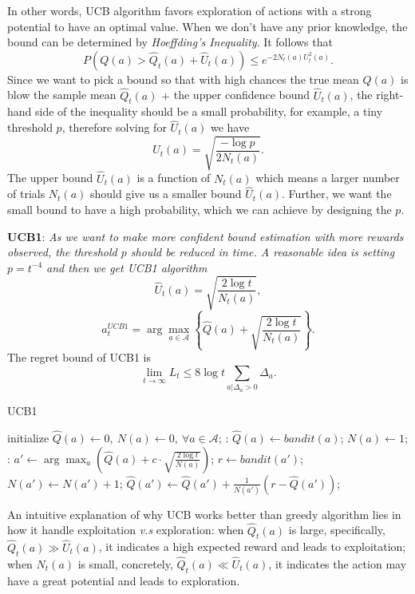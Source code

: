 \documentclass{progartcn}
\begin{document}
    	In other words, UCB algorithm favors exploration of actions with a strong potential to have an optimal value. When we don't have any prior knowledge, the bound can be determined by \textit{Hoeffding's Inequality}. It follows that
    	\[P(Q(a)> \hat{Q}_t(a)+\hat{U}_t(a))\le e^{-2N_t(a)U_t^2(a)}.\]
    	Since we want to pick a bound so that with high chances the true mean $Q(a)$ is blow the sample mean $\hat{Q}_t(a)$ $+$ the upper confidence bound $\hat{U}_t(a)$, the right-hand side of the inequality should be a small probability, for example, a tiny threshold $p$, therefore solving for $\hat{U}_t(a)$ we have
    	\[\hat{U}_t(a)=\sqrt{\frac{-\log p}{2N_t(a)}}.\]
    	The upper bound $\hat{U}_t(a)$ is a function of $N_t(a)$ which means a larger number of trials $N_t(a)$ should give us a smaller bound $\hat{U}_t(a)$. Further, we want the small bound to have a high probability, which we can achieve by designing the $p$.

    	\textbf{UCB1}: \textit{As we want to make more confident bound estimation with more rewards observed, the threshold $p$ should be reduced in time. A reasonable idea is setting $p=t^{-4}$ and then we get UCB1 algorithm}
    	\[\hat{U}_t(a)=\sqrt{\frac{2\log t}{N_t(a)}},\]
    	\[a_t^{UCB1}=\arg\max_{a\in \mathcal{A}}\left\{\hat{Q}(a)+\sqrt{\frac{2\log t}{N_t(a)}}\right\}.\]
    	The regret bound of UCB1 is
    	\[\lim_{t\to\infty}L_t\le 8\log t\sum_{a|\Delta_a>0} \Delta_a.\]

    	\begin{algorithm}[H]
		\caption{UCB1}
		\label{alg: ucb}
		\begin{algorithmic}[1]
			\State initialize $\hat{Q}(a)\gets 0,\ N(a)\gets0,\ \forall a\in\mathcal{A}$;
			:
				\State $\hat{Q}(a)\gets bandit(a)$;
				\State $N(a)\gets 1$;
			\EndFor
			:
				\State $a'\gets\arg\max_{a} \left(\hat{Q}(a)+c\cdot\sqrt{\frac{2\log t}{N(a)}}\right)$;
				\State $r\gets bandit(a')$;
				\State $N(a')\gets N(a')+1$;
				\State $\hat{Q}(a')\gets \hat{Q}(a')+\frac{1}{N(a')}(r-\hat{Q}(a'))$;
        	\EndFor
		\end{algorithmic}
		\end{algorithm}

    	An intuitive explanation of why UCB works better than greedy algorithm lies in how it handle exploitation \textit{v.s} exploration: when $\hat{Q}_t(a)$ is large, specifically, $\hat{Q}_t(a)\gg \hat{U}_t(a)$, it indicates a high expected reward and leads to exploitation; when $N_t(a)$ is small, concretely, $\hat{Q}_t(a)\ll \hat{U}_t(a)$, it indicates the action may have a great potential and leads to exploration.\\
\end{document}
